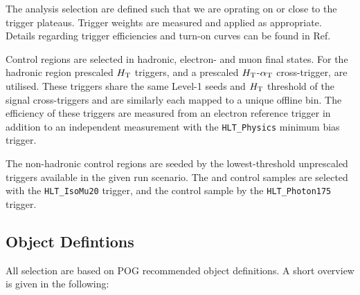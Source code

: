 The analysis selection are defined such that we are oprating on or close to the trigger plateaus. Trigger weights are measured and applied
as appropriate. Details regarding trigger efficiencies and turn-on curves can be found in Ref.~\cite{alphaTnote}


Control regions are selected in hadronic, electron- and muon final states. For the hadronic region 
prescaled $\mbox{$H_\text{T}$}$ triggers, and a prescaled  $\mbox{$H_\text{T}$}$-$\alpha_{\text{T}}$ cross-trigger, are utilised.
These triggers share the same Level-1 seeds and $\mbox{$H_\text{T}$}$ threshold of the signal cross-triggers and are similarly each mapped 
to a unique offline bin. The efficiency of these triggers are measured from an electron 
reference trigger in addition to an independent measurement with the \verb!HLT_Physics! 
minimum bias trigger.


The non-hadronic control regions are seeded by the lowest-threshold unprescaled triggers available in the given run scenario. The 
\mj and \mmj control samples are selected with the \verb!HLT_IsoMu20! trigger, and the \gj control sample by the \verb!HLT_Photon175! trigger. 







\subsection{Object Defintions}

All selection are based on POG recommended object definitions. A short overview is given in the following:

